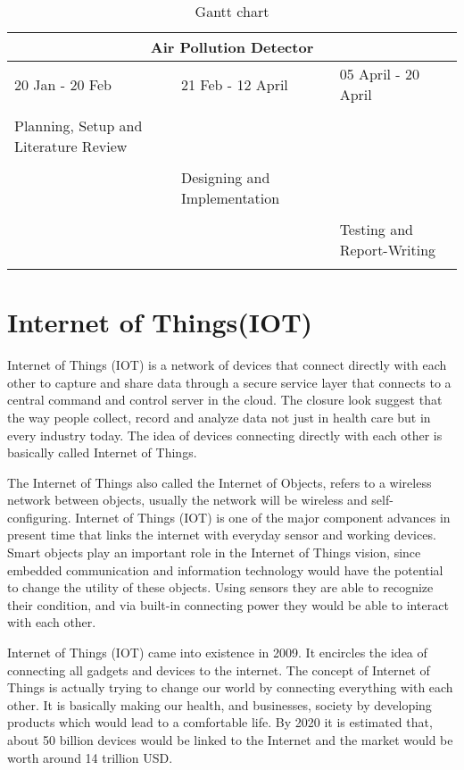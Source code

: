 \begin{table}[!ht]
\centering
\begin{tabular}{ |p{4cm}|p{4cm}|p{4cm}|  }
\hline
\multicolumn{3}{|c|}{Air Pollution Detector} \\
\hline
20 Jan - 20 Feb  &  21 Feb - 12 April  &  05 April - 20 April  \\
\hline
& & \\
Planning, Setup and Literature Review& & \\
& & \\
&Designing and Implementation & \\
& & \\
& & Testing and Report-Writing  \\
& & \\
\hline
\end{tabular}
\caption{\label{ganthchart}Gantt chart}
\end{table}

\section{Internet of Things(IOT)}

Internet of Things (IOT) is a network of devices that connect directly with each other to capture and share data through a secure service layer that connects to a central command and control server in the cloud. The closure look suggest that the way people collect, record and analyze data not just in health care but in every industry today. The idea of devices connecting directly with each other is basically called Internet of Things.

The Internet of Things also called the Internet of Objects, refers to a wireless network between objects, usually the network will be wireless and self-configuring. Internet of Things (IOT) is one of the major component advances in present time that links the internet with everyday sensor and working devices. Smart objects play an important role in the Internet of Things vision, since embedded communication and information technology would have the potential to change the utility of these objects. Using sensors they are able to recognize their condition, and via built-in connecting power they would be able to interact with each other.

Internet of Things (IOT) came into existence in 2009. It encircles the idea of connecting all gadgets and devices to the internet. The concept of Internet of Things is actually trying to change our world by connecting everything with each other. It is basically making our health, and businesses, society by developing products which would lead to a comfortable life. By 2020 it is estimated that, about 50 billion devices would be linked to the Internet and the market would be worth around 14 trillion USD.

